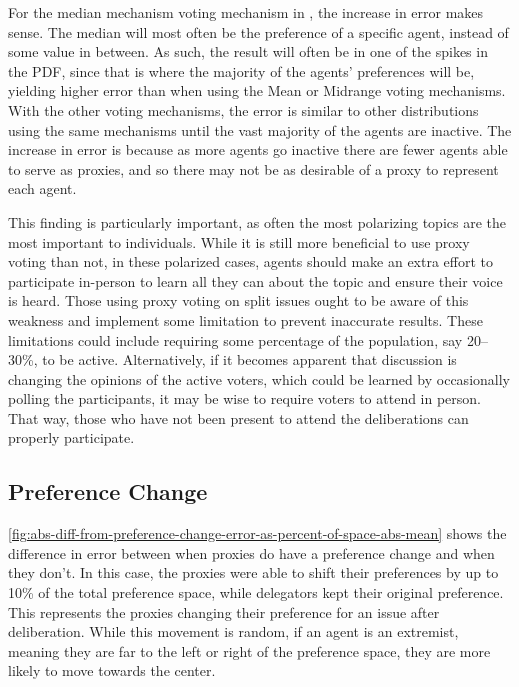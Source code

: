 For the median mechanism voting mechanism in ,
the increase in error makes sense.
The median will most often be the preference of a specific agent, instead of some
value in between.
As such, the result will often be in one of the spikes in the PDF, since that is
where the majority of the agents' preferences will be, yielding higher error than when
using the Mean or Midrange voting mechanisms.
With the other voting mechanisms, the error is similar to other distributions using
the same mechanisms until the vast majority of the agents are inactive.
The increase in error is because as more agents go inactive there are fewer agents able
to serve as proxies, and so there may not be as desirable of a proxy to represent
each agent.

This finding is particularly important, as often the most polarizing topics are the
most important to individuals.
While it is still more beneficial to use proxy voting than not, in these polarized
cases, agents should make an extra effort to participate in-person to learn all they
can about the topic and ensure their voice is heard.
Those using proxy voting on split issues ought to be aware of this weakness and
implement some limitation to prevent inaccurate results.
These limitations could include requiring some percentage of the population, say
20--30\%, to be active.
Alternatively, if it becomes apparent that discussion is changing the opinions of the
active voters, which could be learned by occasionally polling the participants, it
may be wise to require voters to attend in person.
That way, those who have not been present to attend the deliberations can properly
participate.

\subsection{Preference Change}\label{subsec:results-shift}
\autoref{fig:abs-diff-from-preference-change-error-as-percent-of-space-abs-mean} shows
the difference in error between when proxies do have a preference change and when
they don't.
In this case, the proxies were able to shift their preferences by up to 10\% of the
total preference space, while delegators kept their original preference.
This represents the proxies changing their preference for an issue after deliberation.
While this movement is random, if an agent is an extremist, meaning they are far to the
left or right of the preference space, they are more likely to move towards the center.

